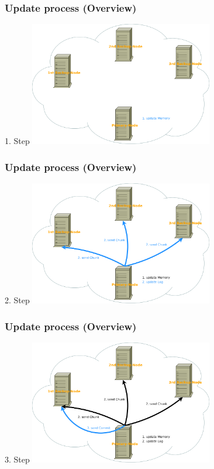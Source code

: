 \documentclass{beamer}
\begin{document}
	\begin{frame}
		\frametitle{Update process (Overview)}

		\begin{block}{1. Step}
			\center\includegraphics[width=8cm]{./img/Log_Overview_01}
		\end{block}
	\end{frame}

	\begin{frame}
		\frametitle{Update process (Overview)}

		\begin{block}{2. Step}
			\center\includegraphics[width=8cm]{./img/Log_Overview_02}
		\end{block}
	\end{frame}

	\begin{frame}
		\frametitle{Update process (Overview)}

		\begin{block}{3. Step}
			\center\includegraphics[width=8cm]{./img/Log_Overview_03}
		\end{block}
	\end{frame}
\end{document}
